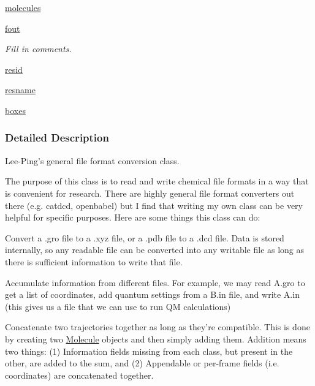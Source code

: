 \begin{DoxyCompactItemize}
\hyperlink{classforcebalance_1_1molecule_1_1Molecule_a2537929702245aab6ab293c145730d7c}{molecules}
\item 
\hyperlink{classforcebalance_1_1molecule_1_1Molecule_a2124792d405b58526af41475e4af3c80}{fout}
\begin{DoxyCompactList}\small\item\em Fill in comments. \end{DoxyCompactList}\item 
\hyperlink{classforcebalance_1_1molecule_1_1Molecule_a7ce0cbbc2f774aaffe3b6ca78b658736}{resid}
\item 
\hyperlink{classforcebalance_1_1molecule_1_1Molecule_ac1def400d819601483ddf475f1389a8d}{resname}
\item 
\hyperlink{classforcebalance_1_1molecule_1_1Molecule_a9b3fb36e61a914b9f0e2c1613357736a}{boxes}
\end{DoxyCompactItemize}


\subsubsection{Detailed Description}
Lee-\/\-Ping's general file format conversion class. 

The purpose of this class is to read and write chemical file formats in a way that is convenient for research. There are highly general file format converters out there (e.\-g. catdcd, openbabel) but I find that writing my own class can be very helpful for specific purposes. Here are some things this class can do\-:


\begin{DoxyItemize}
\item Convert a .gro file to a .xyz file, or a .pdb file to a .dcd file. Data is stored internally, so any readable file can be converted into any writable file as long as there is sufficient information to write that file.
\end{DoxyItemize}


\begin{DoxyItemize}
\item Accumulate information from different files. For example, we may read A.\-gro to get a list of coordinates, add quantum settings from a B.\-in file, and write A.\-in (this gives us a file that we can use to run Q\-M calculations)
\end{DoxyItemize}


\begin{DoxyItemize}
\item Concatenate two trajectories together as long as they're compatible. This is done by creating two \hyperlink{classforcebalance_1_1molecule_1_1Molecule}{Molecule} objects and then simply adding them. Addition means two things\-: (1) Information fields missing from each class, but present in the other, are added to the sum, and (2) Appendable or per-\/frame fields (i.\-e. coordinates) are concatenated together.
\end{DoxyItemize}


